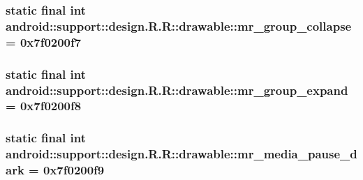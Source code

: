 \hypertarget{classandroid_1_1support_1_1design_1_1_r_1_1drawable_59ec036e84846b05121af99b30c7b5a6}{
\subsubsection[{mr\_\-group\_\-collapse}]{\setlength{\rightskip}{0pt plus 5cm}static final int android::support::design.R.R::drawable::mr\_\-group\_\-collapse = 0x7f0200f7}}
\label{classandroid_1_1support_1_1design_1_1_r_1_1drawable_59ec036e84846b05121af99b30c7b5a6}


\hypertarget{classandroid_1_1support_1_1design_1_1_r_1_1drawable_fb653192d4a6193c14bc52fb9503a1cf}{
\subsubsection[{mr\_\-group\_\-expand}]{\setlength{\rightskip}{0pt plus 5cm}static final int android::support::design.R.R::drawable::mr\_\-group\_\-expand = 0x7f0200f8}}
\label{classandroid_1_1support_1_1design_1_1_r_1_1drawable_fb653192d4a6193c14bc52fb9503a1cf}


\hypertarget{classandroid_1_1support_1_1design_1_1_r_1_1drawable_cafe0164caa756f42c734dcd9fdacdc7}{
\subsubsection[{mr\_\-media\_\-pause\_\-dark}]{\setlength{\rightskip}{0pt plus 5cm}static final int android::support::design.R.R::drawable::mr\_\-media\_\-pause\_\-dark = 0x7f0200f9}}
\label{classandroid_1_1support_1_1design_1_1_r_1_1drawable_cafe0164caa756f42c734dcd9fdacdc7}


